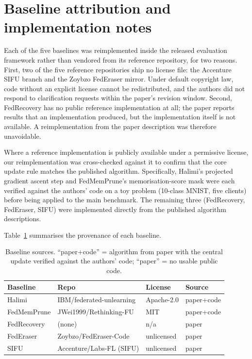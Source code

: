 \section{Baseline attribution and implementation notes}
\label{app:baseline-attribution}

Each of the five baselines was reimplemented inside the released evaluation
framework rather than vendored from its reference repository, for two
reasons. First, two of the five reference repositories ship no license
file: the Accenture SIFU branch and the Zoybzo FedEraser mirror. Under
default copyright law, code without an explicit license cannot be
redistributed, and the authors did not respond to clarification requests
within the paper's revision window. Second, FedRecovery has no public
reference implementation at all; the paper reports results that an
implementation produced, but the implementation itself is not available.
A reimplementation from the paper description was therefore unavoidable.

Where a reference implementation is publicly available under a permissive
license, our reimplementation was cross-checked against it to confirm that
the core update rule matches the published algorithm. Specifically,
Halimi's projected gradient ascent step and FedMemPrune's memorisation-score
mask were each verified against the authors' code on a toy problem (10-class
MNIST, five clients) before being applied to the main benchmark. The
remaining three (FedRecovery, FedEraser, SIFU) were implemented directly
from the published algorithm descriptions.

Table~\ref{tab:baseline-sources} summarises the provenance of each baseline.

\begin{table}[t]
\centering
\scriptsize
\setlength{\tabcolsep}{3pt}
\begin{tabular}{llll}
\toprule
Baseline & Repo & License & Source \\
\midrule
Halimi      & IBM/federated-unlearning  & Apache-2.0 & paper+code \\
FedMemPrune & JWei1999/Rethinking-FU    & MIT        & paper+code \\
FedRecovery & (none)                    & n/a        & paper \\
FedEraser   & Zoybzo/FedEraser-Code     & unlicensed & paper \\
SIFU        & Accenture/Labs-FL (SIFU)  & unlicensed & paper \\
\bottomrule
\end{tabular}
\caption{Baseline sources. ``paper+code'' = algorithm from paper with the central update verified against the authors' code; ``paper'' = no usable public code.}
\label{tab:baseline-sources}
\end{table}

